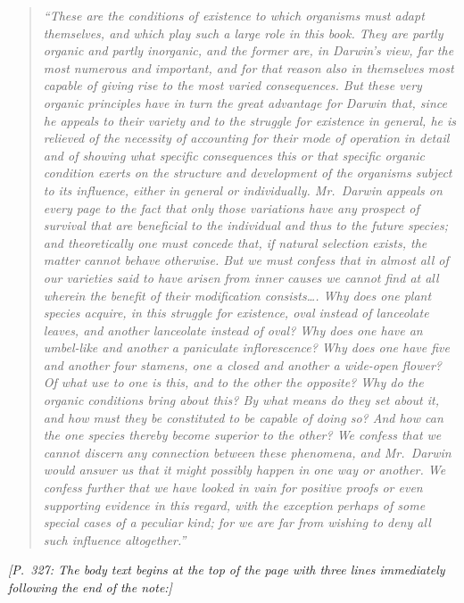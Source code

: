 \documentclass[12pt,a4paper]{article}
\begin{document}
\begin{quote}
\itshape
``These are the conditions of existence to which organisms must
adapt themselves, and which play such a large role in this book.
They are partly organic and partly inorganic, and the former are,
in Darwin's view, far the most numerous and important, and for
that reason also in themselves most capable of giving rise to the
most varied consequences. But these very organic principles have
in turn the great advantage for Darwin that, since he appeals to
their variety and to the struggle for existence in general, he is
relieved of the necessity of accounting for their mode of
operation in detail and of showing what specific consequences this
or that specific organic condition exerts on the structure and
development of the organisms subject to its influence, either in
general or individually. Mr.\ Darwin appeals on every page to
the fact that only those variations have any prospect of survival
that are beneficial to the individual and thus to the future
species; and theoretically one must concede that, if natural
selection exists, the matter cannot behave otherwise. But we must
confess that in almost all of our varieties said to have arisen
from inner causes we cannot find at all wherein the benefit of
their modification consists\ldots. Why does one plant species
acquire, in this struggle for existence, oval instead of
lanceolate leaves, and another lanceolate instead of oval? Why
does one have an umbel-like and another a paniculate
inflorescence? Why does one have five and another four stamens,
one a closed and another a wide-open flower? Of what use to one
is this, and to the other the opposite? Why do the organic
conditions bring about this? By what means do they set about it,
and how must they be constituted to be capable of doing so? And
how can the one species thereby become superior to the other? We
confess that we cannot discern any connection between these
phenomena, and Mr.\ Darwin would answer us that it might possibly
happen in one way or another. We confess further that we have
looked in vain for positive proofs or even supporting evidence in
this regard, with the exception perhaps of some special cases of
a peculiar kind; for we are far from wishing to deny all such
influence altogether.''
\end{quote}

\noindent\textit{[P.\ 327: The body text begins at the top of
the page with three lines immediately following the end of the
note:]}

\medskip
\end{document}
